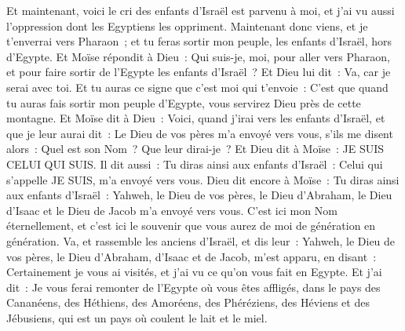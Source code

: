 \begin{multicols}{2}
Et maintenant, voici le cri des enfants d'Israël est parvenu à moi, et j'ai vu aussi l'oppression dont les Egyptiens les oppriment.
Maintenant donc viens, et je t'enverrai vers Pharaon~; et tu feras sortir mon peuple, les enfants d'Israël, hors d'Egypte.
Et Moïse répondit à Dieu~: Qui suis-je, moi, pour aller vers Pharaon, et pour faire sortir de l'Egypte les enfants d'Israël~?
Et Dieu lui dit~: Va, car je serai avec toi. Et tu auras ce signe que c'est moi qui t'envoie~: C'est que quand tu auras fais sortir mon peuple d'Egypte, vous servirez Dieu près de cette montagne.
Et Moïse dit à Dieu~: Voici, quand j'irai vers les enfants d'Israël, et que je leur aurai dit~: Le Dieu de vos pères m'a envoyé vers vous, s'ils me disent alors~: Quel est son Nom~? Que leur dirai-je~?
 Et Dieu dit à Moïse~: JE SUIS CELUI QUI SUIS. Il dit aussi~: Tu diras ainsi aux enfants d'Israël~: Celui qui s'appelle JE SUIS, m'a envoyé vers vous.
Dieu dit encore à Moïse~: Tu diras ainsi aux enfants d'Israël~: Yahweh, le Dieu de vos pères, le Dieu d'Abraham, le Dieu d'Isaac et le Dieu de Jacob m'a envoyé vers vous. C'est ici mon Nom éternellement, et c'est ici le souvenir que vous aurez de moi de génération en génération.
Va, et rassemble les anciens d'Israël, et dis leur~: Yahweh, le Dieu de vos pères, le Dieu d'Abraham, d'Isaac et de Jacob, m'est apparu, en disant~: Certainement je vous ai visités, et j'ai vu ce qu'on vous fait en Egypte.
Et j'ai dit~: Je vous ferai remonter de l'Egypte où vous êtes affligés, dans le pays des Cananéens, des Héthiens, des Amoréens, des Phéréziens, des Héviens et des Jébusiens, qui est un pays où coulent le lait et le miel.

\end{multicols}
